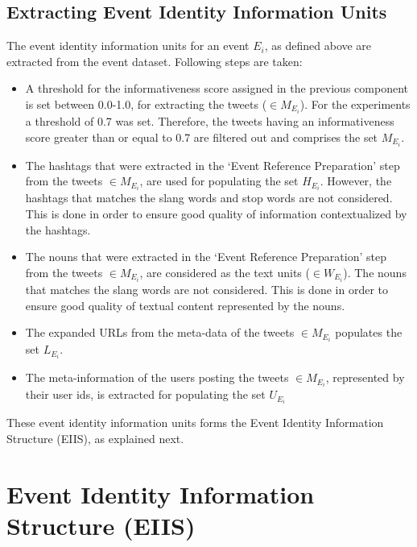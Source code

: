 \subsection{Extracting Event Identity Information Units}
The event identity information units for an event $E_{i}$, as defined above are extracted from the event dataset. Following steps are taken:
\begin{itemize}
\item A threshold for the informativeness score assigned in the previous component is set between 0.0-1.0, for extracting the tweets ($\in M_{E_{i}}$). For the experiments a threshold of 0.7 was set. Therefore, the tweets having an informativeness score greater than or equal to 0.7 are filtered out and comprises the set $M_{E_{i}}$.
\item The hashtags that were extracted in the `Event Reference Preparation' step from the tweets $\in M_{E_{i}}$, are used for populating the set $H_{E_{i}}$. However, the hashtags that matches the slang words and stop words are not considered. This is done in order to ensure good quality of information contextualized by the hashtags.
\item The nouns that were extracted in the `Event Reference Preparation' step from the tweets $\in M_{E_{i}}$, are considered as the text units ($\in W_{E_{i}}$). The nouns that matches the slang words are not considered. This is done in order to ensure good quality of textual content represented by the nouns.
\item The expanded URLs from the meta-data of the tweets $\in M_{E_{i}}$ populates the set $L_{E_{i}}$.
\item The meta-information of the users posting the tweets $\in M_{E_{i}}$, represented by their user ids, is extracted for populating the set $U_{E_{i}}$ 
\end{itemize}  

These event identity information units forms the Event Identity Information Structure (EIIS), as explained next.

\section{Event Identity Information Structure (EIIS)}


